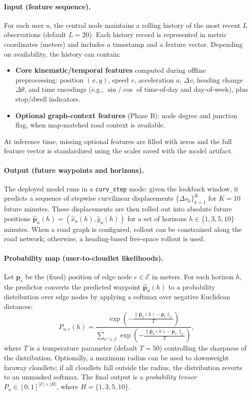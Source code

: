 \paragraph{Input (feature sequence).}
For each user \(u\), the central node maintains a rolling history of the most recent \(L\) observations (default \(L=20\)). Each history record is represented in metric coordinates (meters) and includes a timestamp and a feature vector.
Depending on availability, the history can contain:
\begin{itemize}
  \item \textbf{Core kinematic/temporal features} computed during offline preprocessing: position \((x,y)\), speed \(v\), acceleration \(a\), \(\Delta v\), heading change \(\Delta\theta\), and time encodings (e.g., \(\sin/\cos\) of time-of-day and day-of-week), plus stop/dwell indicators.
  \item \textbf{Optional graph-context features} (Phase B): node degree and junction flag, when map-matched road context is available.
\end{itemize}
At inference time, missing optional features are filled with zeros and the full feature vector is standardized using the scaler saved with the model artifact.

\paragraph{Output (future waypoints and horizons).}
The deployed model runs in a \texttt{curv\_step} mode: given the lookback window, it predicts a sequence of stepwise curvilinear displacements \(\{\Delta s_k\}_{k=1}^{K}\) for \(K=10\) future minutes. These displacements are then rolled out into absolute future positions \(\hat{\mathbf{p}}_u(h)=(\hat{x}_u(h),\hat{y}_u(h))\) for a set of horizons \(h\in\{1,3,5,10\}\) minutes. When a road graph is configured, rollout can be constrained along the road network; otherwise, a heading-based free-space rollout is used.

\paragraph{Probability map (user-to-cloudlet likelihoods).}
Let \(\mathbf{p}_e\) be the (fixed) position of edge node \(e\in\mathcal{E}\) in meters. For each horizon \(h\), the predictor converts the predicted waypoint \(\hat{\mathbf{p}}_u(h)\) to a probability distribution over edge nodes by applying a softmax over negative Euclidean distances:
\[
P_{u,e}(h)=\frac{\exp\left(-\frac{\|\hat{\mathbf{p}}_u(h)-\mathbf{p}_e\|_2}{T}\right)}
{\sum_{e'\in\mathcal{E}}\exp\left(-\frac{\|\hat{\mathbf{p}}_u(h)-\mathbf{p}_{e'}\|_2}{T}\right)},
\]
where \(T\) is a temperature parameter (default \(T=50\)) controlling the sharpness of the distribution. Optionally, a maximum radius can be used to downweight faraway cloudlets; if all cloudlets fall outside the radius, the distribution reverts to an unmasked softmax. The final output is a \emph{probability tensor} \(P_u\in[0,1]^{|\mathcal{E}|\times |H|}\), where \(H=\{1,3,5,10\}\).

